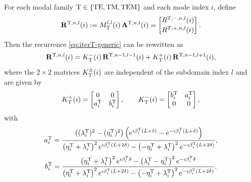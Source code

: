 \documentclass[smallextended]{svjour3}       %
\begin{document}
\begin{proposition}\label{prop:R-ite}
For each modal family ${\rm T}\in\{{\rm TE,TM,TEM}\}$ and each mode index $i$, define
\[
\mathbf R^{{\rm T},n,l}(i):=
M_{\rm T}^{l,l}(i)\,\mathbf A^{{\rm T},n,l}(i)
=
\begin{bmatrix}
R^{{\rm T},-,n,l}(i)\\[2pt]
R^{{\rm T},+,n,l}(i)
\end{bmatrix}.
\]
Then the recurrence \eqref{eq:iterT-generic} can be rewritten as
\begin{equation}\label{eq:R-iteration}
\mathbf R^{{\rm T},n,l}(i)
=
K_{\rm T}^-(i)\,\mathbf R^{{\rm T},n-1,l-1}(i)
+
K_{\rm T}^+(i)\,\mathbf R^{{\rm T},n-1,l+1}(i),
\end{equation}
where the \(2\times 2\) matrices \(K_{\rm T}^\pm(i)\) are independent of the subdomain index \(l\) and are given by
\[
K_{\rm T}^+(i)=
\begin{bmatrix}
0 & 0\\
a_i^{\rm T} & b_i^{\rm T}
\end{bmatrix},
\qquad
K_{\rm T}^-(i)=
\begin{bmatrix}
b_i^{\rm T} & a_i^{\rm T}\\
0 & 0
\end{bmatrix},
\]
with
\begin{equation}\label{eq:aT}
a_i^{\rm T}
=
\frac{\bigl((\lambda_i^{\rm T})^2-(\eta_i^{\rm T})^2\bigr)
\left(e^{\imath\beta_i^{\rm T}(L+\delta)}-e^{-\imath\beta_i^{\rm T}(L+\delta)}\right)}
{\left(\eta_i^{\rm T}+\lambda_i^{\rm T}\right)^2e^{\imath\beta_i^{\rm T}(L+2\delta)}
-
\left(-\eta_i^{\rm T}+\lambda_i^{\rm T}\right)^2e^{-\imath\beta_i^{\rm T}(L+2\delta)}},
\end{equation}
\begin{equation}\label{eq:bT}
b_i^{\rm T}
=
\frac{\left(\eta_i^{\rm T}+\lambda_i^{\rm T}\right)^2e^{\imath\beta_i^{\rm T}\delta}
-
\left(\lambda_i^{\rm T}-\eta_i^{\rm T}\right)^2e^{-\imath\beta_i^{\rm T}\delta}}
{\left(\eta_i^{\rm T}+\lambda_i^{\rm T}\right)^2e^{\imath\beta_i^{\rm T}(L+2\delta)}
-
\left(-\eta_i^{\rm T}+\lambda_i^{\rm T}\right)^2e^{-\imath\beta_i^{\rm T}(L+2\delta)}}.
\end{equation}
\end{proposition}
\end{document}
